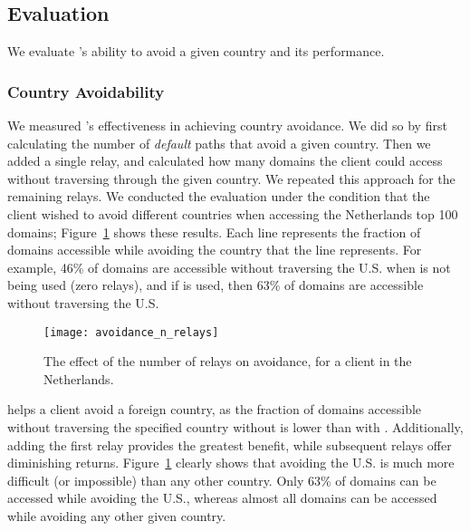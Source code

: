 \subsection{Evaluation}

We evaluate \system{}'s ability to avoid a given country and its performance.

\subsubsection{Country Avoidability}

We measured \system{}'s effectiveness in achieving country avoidance.  We did so by first 
calculating the number of {\it default} paths that avoid a given country.  Then 
we added a single relay, and calculated how many domains the client could 
access without traversing through the given country.  We repeated this approach for 
the remaining relays.  We conducted the evaluation under the condition that 
the client wished to avoid different countries when accessing the Netherlands top 
100 domains; Figure~\ref{fig:avoidance_eval} shows these results.  Each 
line represents the fraction of domains accessible while avoiding the country that 
the line represents.  For example, 46\% of domains are accessible without traversing 
the U.S. when \system{} is not being used (zero relays), and if \system{} is 
used, then 63\% of domains are accessible without traversing the U.S.

\begin{figure}[t]
\tiny
\centering
\texttt{[image: avoidance\_n\_relays]}
\caption{The effect of the number of relays on avoidance, for a client
  in the Netherlands.}
\label{fig:avoidance_eval}
\end{figure}

\system{} helps a client avoid a foreign country,
as the fraction of domains accessible without traversing the specified
country without \system{} is lower than with \system{}.  Additionally,
adding the first relay provides the greatest benefit, while subsequent
relays offer diminishing returns.  Figure~\ref{fig:avoidance_eval}
clearly shows that avoiding the U.S. is much more difficult (or
impossible) than any other country.  Only 63\% of domains can be
accessed while avoiding the U.S., whereas almost all domains can be
accessed while avoiding any other given country.

